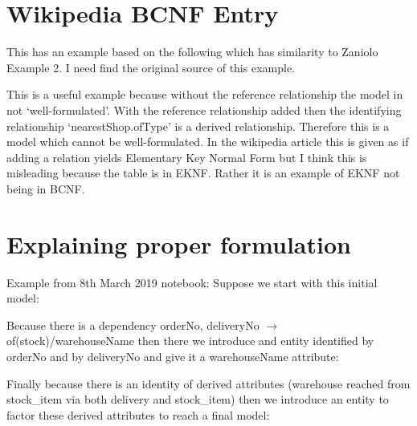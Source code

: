 \documentclass[11pt,a4paper]{scrartcl}
\renewcommand{\erpictureFolder}[0]{../SharedPictures}
\begin{document}
\section{Wikipedia BCNF Entry}
This has an example based on the following which has similarity to Zaniolo Example 2.
I need find the original source of this example.
\begin{center}

\end{center}
This is a useful example because without the reference relationship the model in not `well-formulated'. With the reference relationship added
then the identifying relationship `nearestShop.ofType' is a derived relationship. Therefore this is a model which cannot be well-formulated.
In the wikipedia article this is given as if adding a relation yields Elementary Key Normal Form but I think this is misleading because 
the table is in EKNF. Rather it is an example of EKNF not being in BCNF.

\section{Explaining proper formulation}
Example from 8th March 2019 notebook:
Suppose we start with this initial model:

\begin{center}

\end{center}

Because there is a dependency orderNo, deliveryNo $\longrightarrow$  of(stock)/warehouseName 
then there we introduce and  entity identified by orderNo and by deliveryNo and give it a warehouseName attribute:
\begin{center}

\end{center}
Finally because there is an identity of derived attributes (warehouse reached from stock\_item via both delivery and stock\_item) then
we introduce an entity to factor these derived attributes to reach a final model:


\begin{center}

\end{center}

 

\end{document}
